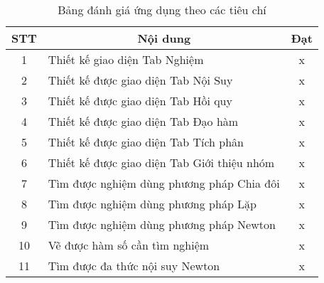 \begin{table}[h]
\caption{Bảng đánh giá ứng dụng theo các tiêu chí}
\centering
\large
\begin{tabular}{|c|l|c|}
\hline
\textbf{STT} & \multicolumn{1}{c|}{\textbf{Nội dung}}                                                                                       & \textbf{Đạt} \\ \hline
1            & Thiết kế giao diện Tab Nghiệm                                                                                                & x            \\ \hline
2            & Thiết kế được giao diện Tab Nội Suy                                                                                          & x            \\ \hline
3            & Thiết kế được giao diện Tab Hồi quy                                                                                          & x            \\ \hline
4            & Thiết kế được giao diện Tab Đạo hàm                                                                                          & x            \\ \hline
5            & Thiết kế được giao diện Tab Tích phân                                                                                        & x            \\ \hline
6            & Thiết kế được giao diện Tab Giới thiệu nhóm                                                                                  & x            \\ \hline
7            & Tìm được nghiệm dùng phương pháp Chia đôi                                                                                    & x            \\ \hline
8            & Tìm được nghiệm dùng phương pháp Lặp                                                                                         & x            \\ \hline
9            & Tìm được nghiệm dùng phương pháp Newton                                                                                      & x            \\ \hline
10           & Vẽ được hàm số cần tìm nghiệm                                                                                                & x            \\ \hline
11           & Tìm được đa thức nội suy Newton                                                                                              & x            \\ \hline

\end{tabular}
\end{table}
